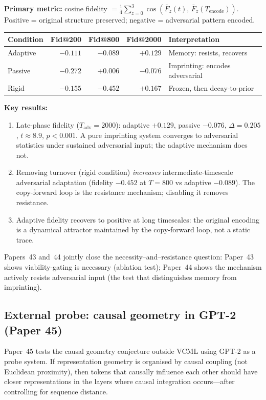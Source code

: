 \documentclass[11pt]{article}
\begin{document}
\textbf{Primary metric:} cosine fidelity $= \frac{1}{4}\sum_{z=0}^{3}
\cos(\bar{F}_z(t),\,\bar{F}_z(T_\mathrm{encode}))$.
Positive = original structure preserved; negative = adversarial pattern encoded.

\begin{center}
\begin{tabular}{lrrrl}
\toprule
Condition & Fid@200 & Fid@800 & Fid@2000 & Interpretation \\
\midrule
Adaptive  & $-0.111$ & $-0.089$ & $+0.129$ & Memory: resists, recovers \\
Passive   & $-0.272$ & $+0.006$ & $-0.076$ & Imprinting: encodes adversarial \\
Rigid     & $-0.155$ & $-0.452$ & $+0.167$ & Frozen, then decay-to-prior \\
\bottomrule
\end{tabular}
\end{center}

\textbf{Key results:}
\begin{enumerate}[itemsep=1pt]
  \item Late-phase fidelity ($T_\mathrm{adv}=2000$): adaptive $+0.129$,
        passive $-0.076$, $\Delta = 0.205$,
        $t \approx 8.9$, $p < 0.001$.
        A pure imprinting system converges to adversarial statistics under sustained
        adversarial input; the adaptive mechanism does not.
  \item Removing turnover (rigid condition) \emph{increases} intermediate-timescale
        adversarial adaptation (fidelity $-0.452$ at $T=800$ vs adaptive $-0.089$).
        The copy-forward loop is the resistance mechanism; disabling it removes resistance.
  \item Adaptive fidelity recovers to positive at long timescales: the original encoding
        is a dynamical attractor maintained by the copy-forward loop, not a static trace.
\end{enumerate}

Papers~43 and~44 jointly close the necessity--and--resistance question:
Paper~43 shows viability-gating is necessary (ablation test);
Paper~44 shows the mechanism actively resists adversarial input
(the test that distinguishes memory from imprinting).

\subsection{External probe: causal geometry in GPT-2 (Paper 45)}

Paper~45 tests the causal geometry conjecture outside VCML using GPT-2 as a probe system.
If representation geometry is organised by causal coupling (not Euclidean proximity),
then tokens that causally influence each other should have closer representations
in the layers where causal integration occurs---after controlling for sequence distance.
\end{document}

